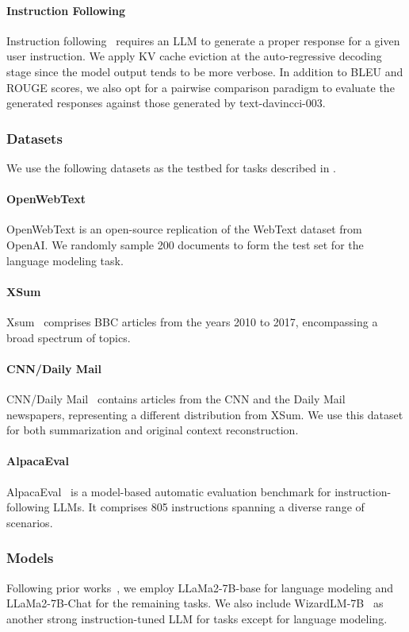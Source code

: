 \paragraph{Instruction Following} Instruction following~\cite{flan} requires an LLM to generate a proper response for a given user instruction. We apply KV cache eviction at the auto-regressive decoding stage since the model output tends to be more verbose. In addition to BLEU and ROUGE scores, we also opt for a pairwise comparison paradigm to evaluate the generated responses against those generated by text-davincci-003.
\subsubsection{Datasets} 
We use the following datasets as the testbed for tasks described in .
\paragraph{OpenWebText} OpenWebText is an open-source replication of the WebText dataset from OpenAI. We randomly sample 200 documents to form the test set for the language modeling task.
\paragraph{XSum} Xsum~\cite{xsum} comprises BBC articles from the years 2010 to 2017, encompassing a broad spectrum of topics.
\paragraph{CNN/Daily Mail} CNN/Daily Mail~\cite{cnndm} contains articles from the CNN and the Daily Mail newspapers, representing a different distribution from XSum. We use this dataset for both summarization and original context reconstruction.
\paragraph{AlpacaEval} AlpacaEval~\cite{alpaca_eval} is a model-based automatic evaluation benchmark for instruction-following LLMs. It comprises 805 instructions spanning a diverse range of scenarios.
\subsubsection{Models}
Following prior works~\cite{h2o,tova}, we employ LLaMa2-7B-base for language modeling and LLaMa2-7B-Chat for the remaining tasks. We also include WizardLM-7B~\cite{wizardlm} as another strong instruction-tuned LLM for tasks except for language modeling.

